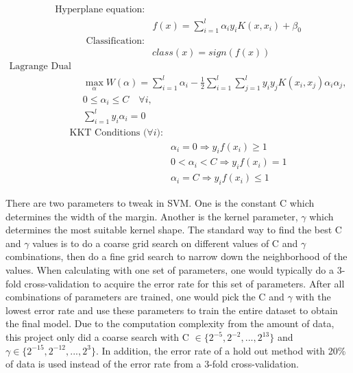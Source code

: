 \documentclass[twoside]{article}
\begin{document}
\begin{align*}
\text{Hyperplane equation:}&\\
&f(x) = \sum\limits_{i=1}^{l}\alpha_iy_iK(x,x_i)+\beta_0
\end{align*}
\begin{align*}
\text{Classification:}&\\
&class(x) = sign(f(x))
\end{align*}
\begin{align*}
\text{Lagrange Dual Problem:}&\\
&\max\limits_{\alpha}^{}  W(\alpha) = \sum\limits_{i=1}^{l} \alpha_i-\frac{1}{2} \sum\limits_{i=1}^{l} \sum\limits_{j=1}^{l}y_iy_jK(x_i,x_j)\alpha_i\alpha_j,\\
&0\leq\alpha_i\leq C \quad \forall i,\\
&\sum\limits_{i=1}^{l}y_i\alpha_i=0
\end{align*}
\begin{align*}
\text{KKT Conditions (}\forall i\text{):}&\\
&\alpha_i=0\Rightarrow y_if(x_i) \geq 1\\
&0<\alpha_i<C\Rightarrow y_if(x_i) = 1\\
&\alpha_i=C\Rightarrow y_if(x_i) \leq 1
\end{align*}

There are two parameters to tweak in SVM. One is the constant C which determines the width of the margin. Another is the kernel parameter, $\gamma$ which determines the most suitable kernel shape. The standard way to find the best C and $\gamma$ values is to do a coarse grid search on different values of C and $\gamma$ combinations, then do a fine grid search to narrow down the neighborhood of the values. When calculating with one set of parameters, one would typically do a 3-fold cross-validation to acquire the error rate for this set of parameters. After all combinations of parameters are trained, one would pick the C and $\gamma$ with the lowest error rate and use these parameters to train the entire dataset to obtain the final model. Due to the computation complexity from the amount of data, this project only did a coarse search with C $\in \{2^{-5},2^{-2},...,2^{13}\}$ and $\gamma \in \{2^{-15}, 2^{-12},...,2^{3}\}$. In addition, the error rate of a hold out method with 20\% of data is used instead of the error rate from a 3-fold cross-validation.
\end{document}
